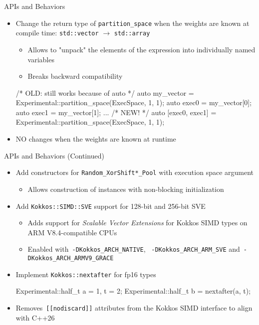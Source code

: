 \begin{frame}[fragile]{APIs and Behaviors}
 \begin{itemize}
   \item Change the return type of \texttt{partition\_space} when the weights are
     known at compile time: \texttt{std::vector} $\rightarrow$
     \texttt{std::array}
    \begin{itemize}
      \item Allows to "unpack" the elements of the expression into individually named variables
      \item Breaks backward compatibility
      \end{itemize}
\begin{code}[keywords={partition_space}]
/* OLD: still works because of auto */
auto my_vector = Experimental::partition_space(ExecSpace, 1, 1);
auto exec0 = my_vector[0];
auto exec1 = my_vector[1];
...
/* NEW! */
auto [exec0, exec1] = Experimental::partition_space(ExecSpace, 1, 1);
\end{code}
   \item NO changes when the weights are known at runtime 
 \end{itemize}
\end{frame}


\begin{frame}[fragile]{APIs and Behaviors (Continued)}
 \begin{itemize}
  \item Add constructors for \texttt{Random\_XorShift*\_Pool} with execution space argument
      \begin{itemize}
      \item Allows construction of instances with non-blocking initialization
    \end{itemize}
     \item Add \texttt{Kokkos::SIMD::SVE} support for 128-bit and 256-bit SVE 
     \begin{itemize}
      \item Adds support for \emph{Scalable Vector Extensions} for Kokkos SIMD types on ARM V8.4-compatible CPUs
      \item Enabled with~\texttt{-DKokkos\_ARCH\_NATIVE}, ~\texttt{-DKokkos\_ARCH\_ARM\_SVE} and~\texttt{-DKokkos\_ARCH\_ARMV9\_GRACE}
     \end{itemize}
     \item Implement \texttt{Kokkos::nextafter} for fp16 types
\begin{code}[keywords={nextafter}]
Experimental::half_t a = 1, t = 2;
Experimental::half_t b = nextafter(a, t);
\end{code}
        \item Removes~\texttt{[[nodiscard]]} attributes from the Kokkos SIMD interface to align with C++26
 \end{itemize}
\end{frame}

